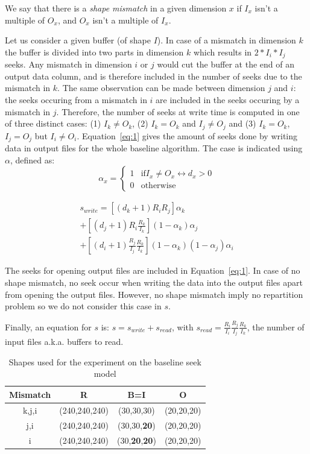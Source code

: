 \documentclass[conference]{IEEEtran}
\begin{document}
We say that there is a \emph{shape mismatch} in a given dimension $x$ if $I_x$
isn't a multiple of $O_x$, and $O_x$ isn't a multiple of $I_x$.

Let us consider a given buffer (of shape $I$). In case of a mismatch in
dimension $k$ the buffer is divided into two parts in dimension $k$ which results
in  $2*I_i*I_j$ seeks. Any mismatch in dimension $i$ or $j$ would cut the
buffer at the end of an output data column, and is therefore included in
the number of seeks due to the mismatch in $k$. The same observation can be made
between dimension $j$ and $i$: the seeks occuring from a mismatch in $i$ are
included in the seeks occuring by a mismatch in $j$. Therefore, the number of
seeks at write time is computed in one of three distinct cases:
(1) $I_k \neq O_k$, (2) $I_k = O_k$ and $I_j \neq O_j$ and (3) $I_k = O_k$,
$I_j = O_j$ but $I_i \neq O_i$. Equation~\ref{eq:1} gives the amount of seeks
done by writing data in output files for the whole baseline algorithm.
The case is indicated using $\alpha$, defined as: \\
$$\alpha_x = \begin{cases}
   1 & \mathrm{if} I_x \neq O_x \leftrightarrow d_x > 0 \\
   0 & \mathrm{otherwise}
\end{cases}$$

\begin{multline} \label{eq:1}
s_{write} = [(d_k+1)R_iR_j]\alpha_k \\ + [(d_j+1)R_i\frac{R_k}{I_k}](1-\alpha_k)\alpha_j \\ + [(d_i+1)\frac{R_j}{I_j}\frac{R_k}{I_k}](1-\alpha_k)(1-\alpha_j)\alpha_i
\end{multline}

The seeks for opening output files are included in Equation~\ref{eq:1}.
In case of no shape mismatch, no seek occur when writing the data into the output
files apart from opening the output files. However, no shape mismatch imply no
repartition problem so we do not consider this case in $s$.

Finally, an equation for $s$ is: $s = s_{write} + s_{read}$,
with $s_{read} = \frac{R_i}{I_i} \frac{R_j}{I_j} \frac{R_k}{I_k}$, the number of
input files a.k.a. buffers to read.


 \begin{table}[ht]
  \centering
  \caption{Shapes used for the experiment on the baseline seek model}

   \begin{tabular}[t]{c c c c}
   \hline
   Mismatch & R & B=I & O \\
     \hline\hline
     k,j,i & (240,240,240) & (30,30,30) & (20,20,20) \\
     \hline
     j,i & (240,240,240) & (30,30,\textbf{20}) & (20,20,20) \\
     \hline
     i & (240,240,240) & (30,\textbf{20},\textbf{20}) & (20,20,20) \\
     \hline
   \end{tabular}

   \label{tab:expseekmodel}

\end{table}
\end{document}

